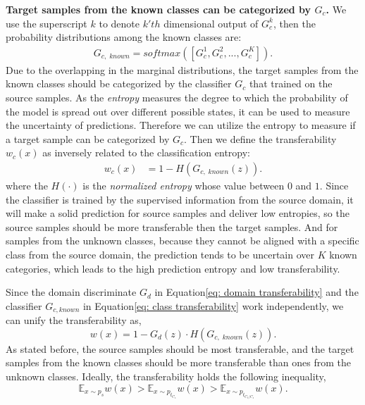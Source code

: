 \textbf{Target samples from the known classes can be categorized by $G_c$.}
We use the superscript $k$ to denote $k'th$ dimensional output of $G_c^k$, then the probability distributions among the known classes are: 
\begin{equation}
    \label{eq: softmaxed}
    \begin{split}
        G_{c,\; known}=softmax([G_c^1,G_c^2,...,G_c^K]).
    \end{split}
\end{equation} 
Due to the overlapping in the marginal distributions, the target samples from the known classes should be categorized by the classifier $G_c$ that trained on the source samples.
As the \textit{entropy} measures the degree to which the probability of the model is spread out over different possible states, it can be used to measure the uncertainty of predictions. 
Therefore we can utilize the entropy to measure if a target sample can be categorized by $G_c$.
Then we define the transferability $w_c(x)$ as inversely related to the classification entropy: 
\begin{equation}
    \label{eq: class transferability}
    \begin{split}
        w_c(x)&=1-H(G_{c,\; known}(z)).
    \end{split}
\end{equation}
where the $H(\cdot)$ is the \textit{normalized entropy} whose value between $0$ and $1$. 
Since the classifier is trained by the supervised information from the source domain, it will make a solid prediction for source samples and deliver low entropies, so the source samples should be more transferable then the target samples. 
And for samples from the unknown classes, because they cannot be aligned with a specific class from the source domain, the prediction tends to be uncertain over $K$ known categories, which leads to the high prediction entropy and low transferability. 

Since the domain discriminate $G_d$ in Equation\ref{eq: domain transferability} and the classifier $G_{c, known}$ in Equation\ref{eq: class transferability} work independently, we can unify the transferability as,
\begin{equation}
    \label{eq: transferability}
    w(x)=1-G_d(z)\cdot H(G_{c,\; known}(z)).
\end{equation} 
As stated before, the source samples should be most transferable, and the target samples from the known classes should be more transferable than ones from the unknown classes. 
Ideally, the transferability holds the following inequality, 
\begin{equation}
    \label{eq: inequation of transferability}
    \mathbb{E}_{x \sim p_s}w(x)>
    \mathbb{E}_{x \sim p_{t_{C_s}}}w(x)>
    \mathbb{E}_{x \sim p_{t_{C_t/C_s}}}w(x).
\end{equation}



